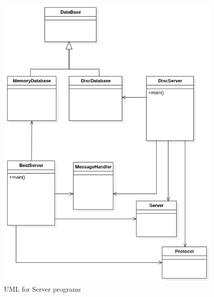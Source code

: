 \documentclass[a4paper]{article}
\begin{document}
\begin{figure}[h]
    \centering
    \includegraphics[width=\textwidth]{serverUML.png}
    \caption{UML for Server programs}
    \label{fig:awesome_image}
\end{figure}
\newpage
\end{document}
